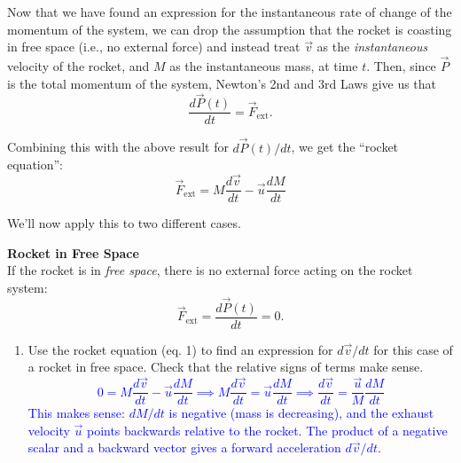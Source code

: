 \documentclass[11pt, letterpaper, openany]{book}
\newenvironment{exercise}[1][Exercise]{%
  \tcolorbox[blanker, breakable, left=1em,
    before skip=1em, after skip=1em,
    borderline west={3pt}{0pt}{PhysNavy},
    colback=PhysCream,
    before upper={\textcolor{PhysNavy}{\sffamily\bfseries #1:}\space}
  ]%
}{%
  \endtcolorbox%
}
\begin{document}
Now that we have found an expression for the instantaneous rate of change of the momentum of the system, we can drop the assumption that the rocket is coasting in free space (i.e., no external force) and instead treat $\vec{v}$ as the \textit{instantaneous} velocity of the rocket, and $M$ as the instantaneous mass, at time $t$. Then, since $\vec{P}$ is the total momentum of the system, Newton's 2nd and 3rd Laws give us that
\[ \frac{d\vec{P}(t)}{dt} = \vec{F}_{\text{ext}}. \]

Combining this with the above result for $d\vec{P}(t)/dt$, we get the ``rocket equation'':
\[ \vec{F}_{\text{ext}} = M\frac{d\vec{v}}{dt} - \vec{u}\frac{dM}{dt} \tag{1} \]

We'll now apply this to two different cases.

\begin{exercise}[Exercise 5]
\textbf{Rocket in Free Space} \\
If the rocket is in \textit{free space}, there is no external force acting on the rocket system:
\[ \vec{F}_{\text{ext}} = \frac{d\vec{P}(t)}{dt} = 0. \]
\begin{enumerate}[label=(\alph*)]
    \item Use the rocket equation (eq. 1) to find an expression for $d\vec{v}/dt$ for this case of a rocket in free space. Check that the relative signs of terms make sense. \\
    \textcolor{blue}{
    \[ 0 = M\frac{d\vec{v}}{dt} - \vec{u}\frac{dM}{dt} \implies M\frac{d\vec{v}}{dt} = \vec{u}\frac{dM}{dt} \implies \frac{d\vec{v}}{dt} = \frac{\vec{u}}{M}\frac{dM}{dt} \]
    This makes sense: $dM/dt$ is negative (mass is decreasing), and the exhaust velocity $\vec{u}$ points backwards relative to the rocket. The product of a negative scalar and a backward vector gives a forward acceleration $d\vec{v}/dt$.
    }
    

\end{enumerate}
\end{exercise}
\end{document}

